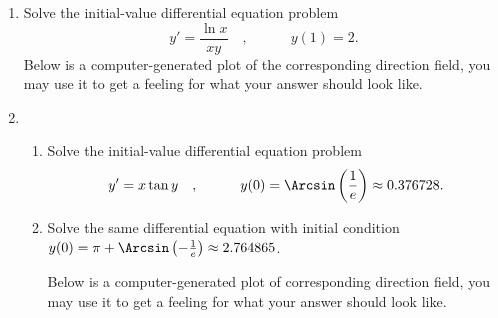 \begin{multicols}{2}
\begin{enumerate}[ref={\fcProblemRef}]
\item Solve the initial-value differential equation problem
\[
y'=\frac{\ln x}{x y}
\quad,\quad  \quad \quad y(1)=2.
\]
Below is a computer-generated plot of the corresponding direction field, you may use it to get a feeling for what your answer should look like.

\item 
\begin{enumerate}[ref={\fcSubProblemRef}]
\item \label{problemDFQseparabley'=xtany_initial_condition1} Solve the initial-value differential equation problem
\[
y'=x\tan y
\quad,\quad  \quad \quad y(0)=\Arcsin\left(\frac{1}{e}\right)\approx 0.376728.
\]

\item \label{problemDFQseparabley'=xtany_initial_condition2} Solve the same differential equation with initial condition $y(0)= \pi+\Arcsin \left(-\frac{1}{e}\right)\approx 2.764865$.



Below is a computer-generated plot of corresponding direction field, you may use it to get a feeling for what your answer should look like.


\end{enumerate}
\end{enumerate}
\end{multicols}